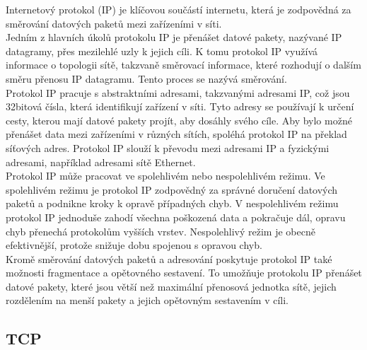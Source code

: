 \documentclass[12pt]{report}			%
\begin{document}
				
Internetový protokol (IP) je klíčovou součástí internetu, která je zodpovědná za směrování datových paketů mezi zařízeními v síti.
\\
Jedním z hlavních úkolů protokolu IP je přenášet datové pakety, nazývané IP datagramy, přes mezilehlé uzly k jejich cíli. K tomu protokol IP využívá informace o topologii sítě, takzvaně směrovací informace, které rozhodují o dalším směru přenosu IP datagramu. Tento proces se nazývá směrování.
\\
Protokol IP pracuje s abstraktními adresami, takzvanými adresami IP, což jsou 32bitová čísla, která identifikují zařízení v síti. Tyto adresy se používají k určení cesty, kterou mají datové pakety projít, aby dosáhly svého cíle. Aby bylo možné přenášet data mezi zařízeními v různých sítích, spoléhá protokol IP na překlad síťových adres. Protokol IP slouží k převodu mezi adresami IP a fyzickými adresami, například adresami sítě Ethernet.
\\
Protokol IP může pracovat ve spolehlivém nebo nespolehlivém režimu. Ve spolehlivém režimu je protokol IP zodpovědný za správné doručení datových paketů a podnikne kroky k opravě případných chyb. V nespolehlivém režimu protokol IP jednoduše zahodí všechna poškozená data a pokračuje dál, opravu chyb přenechá protokolům vyšších vrstev. Nespolehlivý režim je obecně efektivnější, protože snižuje dobu spojenou s opravou chyb.
\\
Kromě směrování datových paketů a adresování poskytuje protokol IP také možnosti fragmentace a opětovného sestavení. To umožňuje protokolu IP přenášet datové pakety, které jsou větší než maximální přenosová jednotka sítě, jejich rozdělením na menší pakety a jejich opětovným sestavením v cíli.\cite{IP1}\cite{IP2}\cite{IP3}\cite{IP4}


				\subsection{TCP}
				
\end{document}
